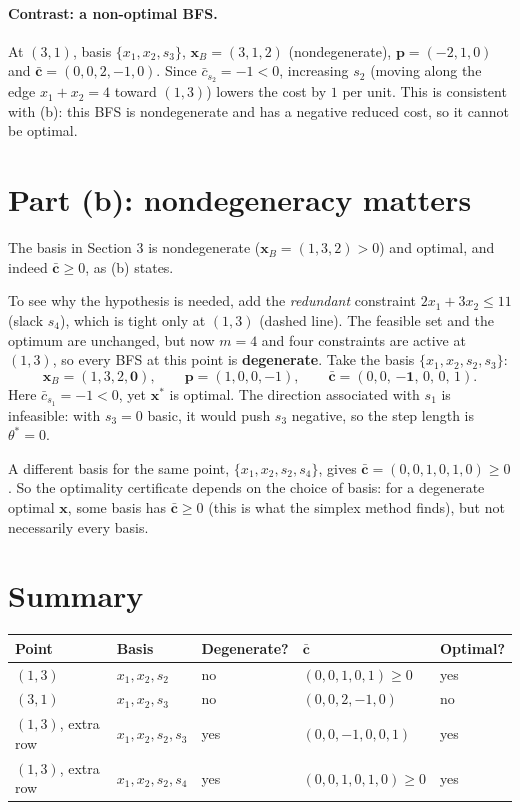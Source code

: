\documentclass[11pt]{article}
\newcommand{\cb}{\bar{\mathbf c}}
\newcommand{\bx}{\mathbf x}
\begin{document}
\paragraph{Contrast: a non-optimal BFS.} At $(3,1)$, basis $\{x_1,x_2,s_3\}$, $\mathbf x_B=(3,1,2)$ (nondegenerate),
$\mathbf p=(-2,1,0)$ and $\cb=(0,0,2,-1,0)$. Since $\bar c_{s_2}=-1<0$, increasing $s_2$ (moving along the edge
$x_1+x_2=4$ toward $(1,3)$) lowers the cost by $1$ per unit. This is consistent with (b): this BFS is nondegenerate and has
a negative reduced cost, so it cannot be optimal.

\section{Part (b): nondegeneracy matters}
The basis in Section 3 is nondegenerate ($\mathbf x_B=(1,3,2)>0$) and optimal, and indeed $\cb\ge0$, as (b) states.

To see why the hypothesis is needed, add the \emph{redundant} constraint $2x_1+3x_2\le 11$ (slack $s_4$), which is
tight only at $(1,3)$ (dashed line). The feasible set and the optimum are unchanged, but now $m=4$ and four constraints are
active at $(1,3)$, so every BFS at this point is \textbf{degenerate}. Take the basis $\{x_1,x_2,s_2,s_3\}$:
\[
\mathbf x_B=(1,3,2,\mathbf{0}),\qquad \mathbf p=(1,0,0,-1),\qquad
\cb=(0,0,\,\mathbf{-1},\,0,\,0,\,1).
\]
Here $\bar c_{s_1}=-1<0$, yet $\bx^*$ is optimal. The direction associated with $s_1$ is infeasible: with
$s_3=0$ basic, it would push $s_3$ negative, so the step length is $\theta^*=0$.

A different basis for the same point, $\{x_1,x_2,s_2,s_4\}$, gives $\cb=(0,0,1,0,1,0)\ge0$. So the optimality
certificate depends on the choice of basis: for a degenerate optimal $\bx$, some basis has $\cb\ge0$ (this is what
the simplex method finds), but not necessarily every basis.

\section{Summary}\small
\begin{center}
\begin{tabular}{lllll}
\hline
Point & Basis & Degenerate? & $\cb$ & Optimal?\\ \hline
$(1,3)$ & $x_1,x_2,s_2$ & no & $(0,0,1,0,1)\ge0$ & yes\\
$(3,1)$ & $x_1,x_2,s_3$ & no & $(0,0,2,-1,0)$ & no\\
$(1,3)$, extra row & $x_1,x_2,s_2,s_3$ & yes & $(0,0,-1,0,0,1)$ & yes\\
$(1,3)$, extra row & $x_1,x_2,s_2,s_4$ & yes & $(0,0,1,0,1,0)\ge0$ & yes\\ \hline
\end{tabular}
\end{center}
\end{document}
